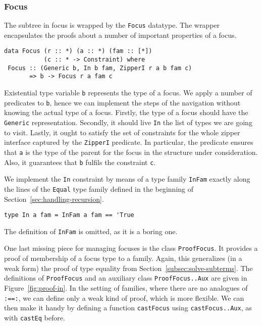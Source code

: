 \documentclass[runningheads]{llncs}
\newcommand{\K}[1]{\lstinline[style=fancy]{#1}}
\begin{document}
\subsubsection{Focus}

The subtree in focus is wrapped by the \K{Focus} datatype. 
The wrapper encapsulates the proofs about a number of important properties of a focus.
\begin{lstlisting}[style=fancy]
data Focus (r :: *) (a :: *) (fam :: [*])
           (c :: * -> Constraint) where
 Focus :: (Generic b, In b fam, ZipperI r a b fam c)
       => b -> Focus r a fam c
\end{lstlisting}
Existential type variable \K{b} represents the type of a focus. We apply a number of predicates to \K{b}, hence we can implement the steps of the navigation without knowing the actual type of a focus. Firstly, the type of a focus should have the \K{Generic} representation. Secondly, it should live \K{In} the list of types we are going to visit. Lastly, it ought to satisfy the set of constraints for the whole zipper interface captured by the \K{ZipperI} predicate. In particular, the predicate ensures that \K{a} is the type of the parent for the focus in the structure under consideration. Also, it guarantees that \K{b} fulfils the constraint \K{c}.

We implement the \K{In} constraint by means of a type family \K{InFam} exactly along the lines of the \K{Equal} type family defined in the beginning of Section~\ref{sec:handling-recursion}. 
\begin{lstlisting}[style=fancy]
type In a fam = InFam a fam == 'True
\end{lstlisting}
The definition of \K{InFam} is omitted, as it is a boring one.

One last missing piece for managing focuses is the class \K{ProofFocus}. It provides a proof of membership of a focus type to a family. Again, this generalizes (in a weak form) the proof of type equality from Section~\ref{subsec:solve-subterms}. The definitions of \K{ProofFocus} and an auxiliary class \K{ProofFocus..Aux} are given in Figure~\ref{fig:proof-in}. In the setting of families, where there are no analogues of \K{:==:}, we can define only a weak kind of proof, which is more flexible. We can then make it handy by defining a function \K{castFocus} using \K{castFocus..Aux}, as with \K{castEq} before.
\end{document}
